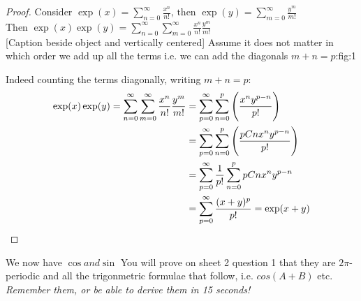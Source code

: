 \begin{proof}
Consider $\displaystyle{\exp(x) = \sum_{n=0}^{\infty} \frac{x^n}{n!} \text{, then } \exp(y) = \sum_{m=0}^{\infty}\frac{y^m}{m!}}$\\

Then $\displaystyle{\exp(x)\exp(y) = \sum_{n=0}^{\infty}\sum_{m=0}^{\infty}\frac{x^n}{n!}\frac{y^m}{m!}}$\\



[Caption beside object and vertically centered]{ 
Assume it does not matter in which order we add up all the terms i.e. we can add the diagonals $m+n = p$:}{fig:1}


Indeed counting the terms diagonally, writing $m+n = p$: \\

\[\begin{align} \nonumber \exp(x)\exp(y) = \sum_{n=0}^{\infty}\sum_{m=0}^{\infty}\frac{x^n}{n!}\frac{y^m}{m!} &= \sum_{p=0}^{\infty}\sum_{n=0}^{p} \left(\frac{x^ny^{p-n}}{p!} \right) \\\vspace*{5pt} \nonumber
&= \sum_{p=0}^{\infty}\sum_{n=0}^{p}\left(\frac{pCn x^n y^{p-n}}{p!}\right) \\\vspace*{5pt} \nonumber
&= \sum_{p=0}^{\infty} \frac{1}{p!} \sum_{n=0}^{p} pCn x^n y^{p-n} \\\vspace*{5pt} \nonumber
&= \sum_{p=0}^{\infty} \frac{(x+y)^p}{p!} = \exp(x+y) \end{align}\]

\end{proof}

We now have $\cos and \sin$ You will prove on sheet 2 question 1 that they are $2\pi$-periodic and all the trigonmetric formulae that follow, i.e. $cos(A+B)$ etc. \textit{Remember them, or be able to derive them in 15 seconds!}\\\\

